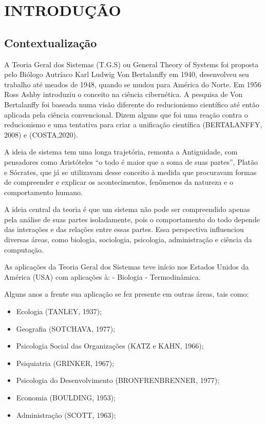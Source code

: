 \section{INTRODUÇÃO}
\subsection{Contextualização}

A Teoria Geral dos Sistemas (T.G.S) ou General Theory of Systems foi proposta pelo Biólogo Autríaco Karl Ludwig Von Bertalanffy em 1940, desenvolveu seu trabalho até meados de 1948, quando se mudou para América do Norte. Em 1956 Ross Ashby introduziu o conceito na ciência cibernética. A pesquisa de Von Bertalanffy foi baseada numa visão diferente do reducionismo científico até então aplicada pela ciência convencional. Dizem alguns que foi uma reação contra o reducionismo e uma tentativa para criar a unificação científica (BERTALANFFY, 2008) e (COSTA,2020).\vskip0.3cm

A ideia de sistema tem uma longa trajetória, remonta a Antiguidade, com pensadores como Aristóteles “o todo é maior que a soma de suas partes”, Platão e Sócrates, que já se utilizavam desse conceito à medida que procuravam formas de compreender e explicar os acontecimentos, fenômenos da natureza e o comportamento humano.\vskip0.3cm

A ideia central da teoria é que um sistema não pode ser compreendido apenas pela análise de suas partes isoladamente, pois o comportamento do todo depende das interações e das relações entre essas partes. Essa perspectiva influenciou diversas áreas, como biologia, sociologia, psicologia, administração e ciência da computação.\vskip0.3cm



As aplicações da Teoria Geral dos Sistemas teve início nos Estados Unidos da América (USA) com aplicações à: - Biologia - Termodinâmica.\vskip0.3cm

Alguns anos a frente sua aplicação se fez presente em outras áreas, tais como:

\begin{itemize}
    \item Ecologia (TANLEY, 1937);
    \item Geografia (SOTCHAVA, 1977);
    \item Psicologia Social das Organizações (KATZ e KAHN, 1966);
    \item Psiquiatria (GRINKER, 1967);
    \item Psicologia do Desenvolvimento (BRONFRENBRENNER, 1977);
    \item Economia (BOULDING, 1953);
    \item Administração (SCOTT, 1963);
\end{itemize}

